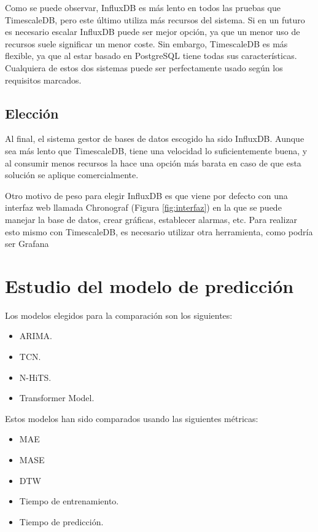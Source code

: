 Como se puede observar, InfluxDB es más lento en todos las pruebas que TimescaleDB, pero este último utiliza más 
recursos del sistema. Si en un futuro es necesario escalar InfluxDB puede ser mejor opción, ya que un menor uso de 
recursos suele significar un menor coste. Sin embargo, TimescaleDB es más flexible, ya que al estar basado en PostgreSQL 
tiene todas sus características. Cualquiera de estos dos sistemas puede ser perfectamente usado según los requisitos marcados.

\subsection{Elección}

Al final, el sistema gestor de bases de datos escogido ha sido InfluxDB. Aunque sea más lento que TimescaleDB, tiene
una velocidad lo suficientemente buena, y al consumir menos recursos la hace una opción más barata en caso de que 
esta solución se aplique comercialmente.

Otro motivo de peso para elegir InfluxDB es que viene por defecto con una interfaz web llamada Chronograf 
(Figura \ref{fig:interfaz}) en la que se puede manejar la base de datos, crear gráficas, establecer alarmas, etc. 
Para realizar esto mismo con TimescaleDB, es necesario utilizar otra herramienta, como podría ser Grafana \cite{Web:Grafana:Docs}


\section{Estudio del modelo de predicción}

Los modelos elegidos para la comparación son los siguientes:
\begin{itemize}
    \item ARIMA.
    \item TCN.
    \item N-HiTS.
    \item Transformer Model.
\end{itemize}

Estos modelos han sido comparados usando las siguientes métricas:
\begin{itemize}
    \item MAE 
    \item MASE 
    \item DTW
    \item Tiempo de entrenamiento.
    \item Tiempo de predicción.
\end{itemize}

